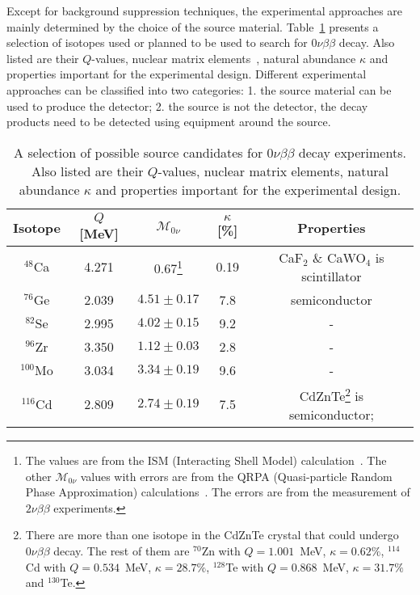 Except for background suppression techniques, the experimental approaches are mainly determined by the choice of the source material. Table~\ref{tab:gerda:iso} presents a selection of isotopes used or planned to be used to search for $0\nu\beta\beta$ decay. Also listed are their $Q$-values, nuclear matrix elements~\cite{Mut90, Rod07, Sim08, Cau08}, natural abundance $\kappa$ and properties important for the experimental design. Different experimental approaches can be classified into two categories: 1. the source material can be used to produce the detector; 2. the source is not the detector, the decay products need to be detected using equipment around the source.
\begin{table}[htbp]
  \centering
  \caption{A selection of possible source candidates for         $0\nu\beta\beta$ decay experiments. Also listed are their $Q$-values,     nuclear matrix elements, natural abundance $\kappa$ and properties     important for the experimental design.}
  \label{tab:gerda:iso}
  \begin{minipage}{\linewidth}
    \begin{tabular}{ccccc} \hline Isotope & $Q$ [MeV] &       $\mathcal{M}_{0\nu}$ & $\kappa$ [\%] & Properties \\\hline       $^{48}$Ca & 4.271 & 0.67\footnote{The values are from the ISM         (Interacting Shell Model) calculation~\cite{Cau08}.  The other         $\mathcal{M}_{0\nu}$ values with errors are from the QRPA         (Quasi-particle Random Phase Approximation)         calculations~\cite{Rod07}. The errors are from the measurement         of $2\nu\beta\beta$ experiments.} & 0.19 & CaF$_{2}$ \&       CaWO$_{4}$ is scintillator \\
      $^{76}$Ge & 2.039 & $4.51 \pm 0.17$ & 7.8 & semiconductor \\
      $^{82}$Se & 2.995 & $4.02 \pm 0.15$ & 9.2 & - \\
      $^{96}$Zr & 3.350 & $1.12 \pm 0.03$ & 2.8 & - \\
      $^{100}$Mo & 3.034 & $3.34 \pm 0.19$ & 9.6 & - \\
      $^{116}$Cd & 2.809 & $2.74 \pm 0.19$ & 7.5 &       CdZnTe\footnote{There are more than one isotope in the CdZnTe         crystal that could undergo $0\nu\beta\beta$ decay. The rest of         them are $^{70}$Zn with $Q = 1.001$~MeV, $\kappa = 0.62\%$,         $^{114}$Cd with $Q = 0.534$~MeV, $\kappa = 28.7\%$, $^{128}$Te         with $Q = 0.868$~MeV, $\kappa = 31.7\%$ and $^{130}$Te.} is       semiconductor;\\

\end{tabular}
\end{minipage}
\end{table}
